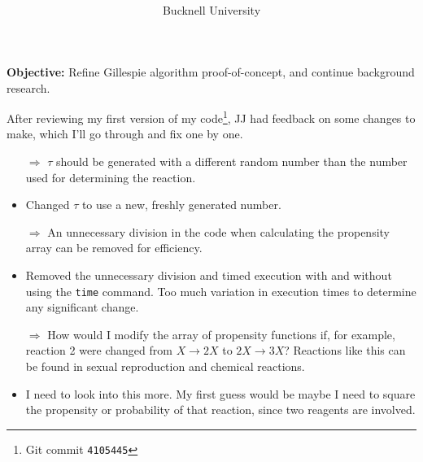 \documentclass[oneside]{labbook}
\newcommand{\obj}[1]{\textbf{Objective:} #1}
\newcommand{\commit}[1]{\footnote{Git commit \texttt{#1}}}
\begin{document}
\title{
}

\author{
  \\ \\
  Bucknell University
}

\date{}

\maketitle

\printindex
\tableofcontents

\pagestyle{scrheadings}


\obj{Refine Gillespie algorithm proof-of-concept, and continue background research.}

After reviewing my first version of my code\commit{4105445}, JJ had
feedback on some changes to make, which I'll go through and fix one by one.

\begin{itemize}
  \item[$\Rightarrow$] $\tau$ should be generated with a different random number than the number used
  for determining the reaction.
  \item Changed $\tau$ to use a new, freshly generated number.

  \item[$\Rightarrow$] An unnecessary division in the code when calculating the
  propensity array can be removed for efficiency.
  \item Removed the unnecessary division and timed execution with and without
  using the \texttt{time} command. Too much variation in execution times to determine
  any significant change.

  \item[$\Rightarrow$] How would I modify the array of propensity functions if,
  for example, reaction 2 were changed from $X \rightarrow 2X$ to $2X \rightarrow 3X$?
  Reactions like this can be found in sexual reproduction and chemical reactions.
  \item I need to look into this more. My first guess would be maybe I need to
  square the propensity or probability of that reaction, since two reagents are involved.
\end{itemize}
\end{document}
